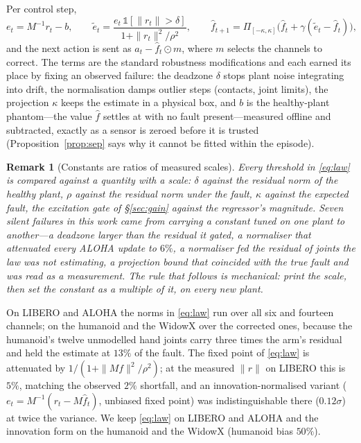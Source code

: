 \documentclass{article}
\newtheorem{remark}{Remark}
\newcommand{\fhat}{\hat{f}}
\begin{document}
Per control step,
\begin{equation}
\label{eq:law}
e_t = M^{-1} r_t - b,\qquad
\tilde e_t = \frac{e_t\,\mathbb{1}[\|r_t\|>\delta]}{1+\|r_t\|^2/\rho^2},\qquad
\fhat_{t+1} = \Pi_{[-\kappa,\kappa]}\!\big(\fhat_t + \gamma(\tilde e_t - \fhat_t)\big),
\end{equation}
and the next action is sent as $a_t - \fhat_t \odot m$, where $m$ selects the channels to
correct. The terms are the standard robustness modifications and each earned its place by
fixing an observed failure: the deadzone $\delta$ stops plant noise integrating into drift,
the normalisation damps outlier steps (contacts, joint limits), the projection $\kappa$ keeps
the estimate in a physical box, and $b$ is the healthy-plant phantom---the value $\fhat$
settles at with no fault present---measured offline and subtracted, exactly as a sensor is
zeroed before it is trusted (Proposition~\ref{prop:sep} says why it cannot be fitted
within the episode).

\begin{remark}[Constants are ratios of measured scales]
\label{rem:scale}
Every threshold in \eqref{eq:law} is compared against a quantity with a scale: $\delta$
against the residual norm of the healthy plant, $\rho$ against the residual norm under the
fault, $\kappa$ against the expected fault, the excitation gate of \S\ref{sec:gain} against
the regressor's magnitude. Seven silent failures in this work came from carrying a constant
tuned on one plant to another---a deadzone larger than the residual it gated, a normaliser
that attenuated every ALOHA update to $6\%$, a normaliser fed the residual of joints the law
was not estimating, a projection bound that coincided with the true fault and was read as a
measurement. The rule that follows is mechanical: print the scale,
then set the constant as a multiple of it, on every new plant.
\end{remark}

On LIBERO and ALOHA the norms in \eqref{eq:law} run over all six and fourteen channels; on
the humanoid and the WidowX over the corrected ones, because the humanoid's twelve unmodelled
hand joints carry three times the arm's residual and held the estimate at $13\%$ of the fault. The
fixed point of \eqref{eq:law} is attenuated by $1/(1+\|Mf\|^2/\rho^2)$; at the measured
$\|r\|$ on LIBERO this is $5\%$, matching the observed $2\%$ shortfall, and an
innovation-normalised variant ($e_t = M^{-1}(r_t - M\fhat_t)$, unbiased fixed point) was
indistinguishable there ($0.12\sigma$) at twice the variance. We keep \eqref{eq:law} on
LIBERO and ALOHA and the innovation form on the humanoid and the WidowX (humanoid bias $50\%$).
\end{document}
